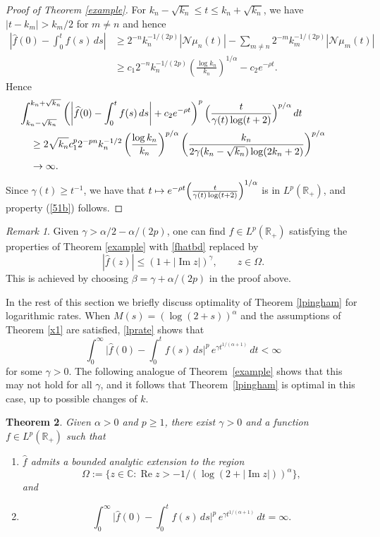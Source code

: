 \documentclass[11pt]{amsart}
\newtheorem{theorem}{Theorem}[section]
\theoremstyle{definition}
\theoremstyle{remark}
\newtheorem{remark}[theorem]{Remark}
\numberwithin{equation}{section}
\begin{document}
\begin{proof}[Proof of Theorem \rm\ref{example}]
For $k_n - \sqrt{k_n} \le t \le k_{n} + \sqrt{k_n}$, we have $|t-k_m| > k_m/2$ for $m \ne n$ and hence
\begin{align*}
\left|\widehat f(0) - \int_0^t f(s) \, ds  \right|
 &\ge 2^{-n}k_{n}^{-1/(2p)} \left| {{\mathcal N}}\mu_n(t) \right| - \sum_{m \ne n} 2^{-m}k_{m}^{-1/(2p)} \left| {{\mathcal N}}\mu_m(t) \right| \\
&\ge  c_1  2^{-n}k_{n}^{-1/(2p)} \left( \frac{ \log k_{n}}{k_{n}} \right)^{1/\alpha} - c_2 e^{-\rho t}.
\end{align*}
Hence
\begin{align*}
\lefteqn{\hskip-10pt\int_{k_n-\sqrt{k_n}}^{k_{n}+\sqrt{k_n}} \left( \left|\widehat f(0) - \int_0^t f(s) \, ds\right| + c_2 e^{-\rho t} \right)^p \Bigl(\frac{t}{\gamma(t)\log (t+2)}\Bigr)^{p/\alpha}
\,dt}  \\
&\ge 2 \sqrt{k_n} c_1^p 2^{-pn} k_{n}^{-1/2} \left( \frac{ \log k_{n}}{k_{n}} \right)^{p/\alpha} \left( \frac{k_n }{2 \gamma(k_n-\sqrt{k_n}) \log(2k_{n} + 2)} \right)^{p/\alpha}\\
&\to\infty.
\end{align*}
Since $\gamma(t) \ge t^{-1}$, we have that $t \mapsto e^{-\rho t} \Bigl(\frac{t}{\gamma(t)\log (t+2)}\Bigr)^{1/\alpha}$ is in $L^p({{\mathbb R}}_+)$, and property (\ref{51b}) follows.
\end{proof}

\begin{remark}  Given $\gamma > \alpha/2 - \alpha/(2p)$, one can find $f \in L^p({{\mathbb R}}_+)$ satisfying the properties of Theorem \ref{example} with \eqref{fhatbd} replaced by
$$|\widehat f(z)| \le (1 + |{\operatorname{Im}} z|)^\gamma, \qquad z \in\Omega.
$$
This is achieved by choosing $\beta = \gamma + \alpha/(2p)$ in the proof above.
\end{remark}

In the rest of this section we briefly discuss optimality of Theorem \ref{lpingham} for logarithmic rates.  When $M(s) = (\log (2+s))^\alpha$ and the assumptions of Theorem \ref{x1} are satisfied, \eqref{lprate} shows that
$$
\int_0^\infty
\Big|\widehat f(0)
-\int_{0}^{t} f(s) \, ds \Big|^p \, e^{\gamma t^{1/(\alpha+1)}}\,dt < \infty
$$
for some $\gamma>0$.  The following analogue of Theorem~\ref{example} shows that this may not hold for all $\gamma$, and it follows that Theorem~\ref{lpingham} is optimal in this case, up to possible changes of $k$.

\begin{theorem}\label{exampleB}
Given $\alpha>0$ and $p\ge 1$, there exist $\gamma>0$ and a function $f\in L^p (\mathbb R_+)$ such that
\begin{enumerate} [\rm(a)]
\item $ \widehat f$ admits a bounded analytic extension to the region
$$
\Omega:= \big\{z\in\mathbb C: {\operatorname{Re}} z >  -1/(\log (2+|{\operatorname{Im}} z|))^\alpha \big\},
$$
and
\item
$$
\int_0^\infty
\Big|\widehat f(0)
-\int_{0}^{t} f(s) \, ds \Big|^p \, e^{\gamma t^{1/(\alpha+1)}}\,dt=\infty.
$$
\end{enumerate}
\end{theorem}
\end{document}
